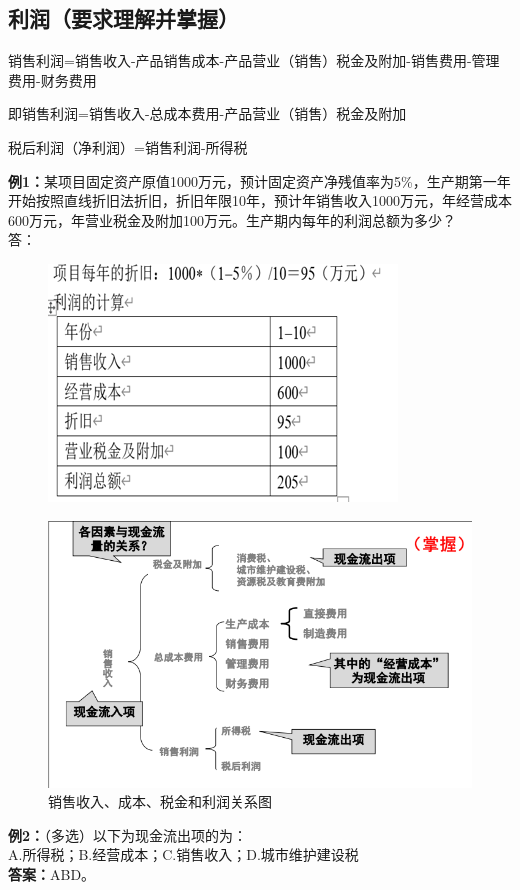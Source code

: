 \subsection{利润（要求理解并掌握）}
销售利润=销售收入-产品销售成本-产品营业（销售）税金及附加-销售费用-管理费用-财务费用

即销售利润=销售收入-总成本费用-产品营业（销售）税金及附加

税后利润（净利润）=销售利润-所得税

\noindent \textbf{例1：}某项目固定资产原值1000万元，预计固定资产净残值率为5\%，生产期第一年开始按照直线折旧法折旧，折旧年限10年，预计年销售收入1000万元，年经营成本600万元，年营业税金及附加100万元。生产期内每年的利润总额为多少？\\
答：
\begin{figure}[H]
    \centering
    \includegraphics[width=0.8\linewidth]{image/利润总额.png}
\end{figure}
\begin{figure}[H]
    \centering
    \caption{销售收入、成本、税金和利润关系图}
    \includegraphics[width=0.8\linewidth]{image/销售收入、成本、税金和利润关系图.png}
\end{figure}
\noindent \textbf{例2：}（多选）以下为现金流出项的为：\\
A.所得税；B.经营成本；C.销售收入；D.城市维护建设税\\
\textbf{答案：}ABD。

